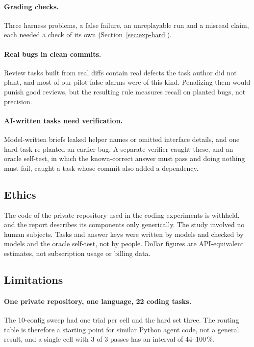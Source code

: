 \paragraph{Grading checks.} Three harness problems, a false failure, an unreplayable run and a misread claim, each needed a check of its own (Section~\ref{sec:exp-hard}).

\paragraph{Real bugs in clean commits.} Review tasks built from real diffs contain real defects the task author did not plant, and most of our pilot false alarms were of this kind. Penalizing them would punish good reviews, but the resulting rule measures recall on planted bugs, not precision.

\paragraph{AI-written tasks need verification.} Model-written briefs leaked helper names or omitted interface details, and one hard task re-planted an earlier bug. A separate verifier caught these, and an oracle self-test, in which the known-correct answer must pass and doing nothing must fail, caught a task whose commit also added a dependency.

\subsection{Ethics}\label{sec:ethics}

The code of the private repository used in the coding experiments is withheld, and the report describes its components only generically. The study involved no human subjects. Tasks and answer keys were written by models and checked by models and the oracle self-test, not by people. Dollar figures are API-equivalent estimates, not subscription usage or billing data.

\subsection{Limitations}\label{sec:limitations}

\paragraph{One private repository, one language, 22 coding tasks.} The 10-config sweep had one trial per cell and the hard set three. The routing table is therefore a starting point for similar Python agent code, not a general result, and a single cell with 3 of 3 passes has an interval of 44--100\,\%.

